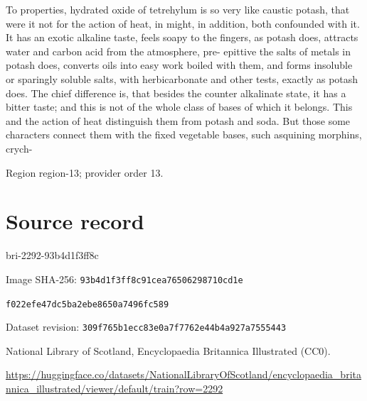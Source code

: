\documentclass[11pt]{article}
\begin{document}
To properties, hydrated oxide of tetrehylum is so very like caustic potash, that were it not for the action of heat, in might, in addition, both confounded with it. It has an exotic alkaline taste, feels soapy to the fingers, as potash does, attracts water and carbon acid from the atmosphere, pre- epittive the salts of metals in potash does, converts oils into easy work boiled with them, and forms insoluble or sparingly soluble salts, with herbicarbonate and other tests, exactly as potash does. The chief difference is, that besides the counter alkalinate state, it has a bitter taste; and this is not of the whole class of bases of which it belongs. This and the action of heat distinguish them from potash and soda. But those some characters connect them with the fixed vegetable bases, such asquining morphins, crych-
\par

{\scriptsize\color{gray} Region region-13; provider order 13.\par}
\medskip
\newpage\section*{Source record}
bri-2292-93b4d1f3ff8c\par
Image SHA-256: \texttt{93b4d1f3ff8c91cea76506298710cd1e}\par\texttt{f022efe47dc5ba2ebe8650a7496fc589}\par
Dataset revision: \texttt{309f765b1ecc83e0a7f7}\texttt{762e44b4a927a7555443}\par
National Library of Scotland, Encyclopaedia Britannica Illustrated (CC0).\par
\url{https://huggingface.co/datasets/NationalLibraryOfScotland/encyclopaedia_britannica_illustrated/viewer/default/train?row=2292}
\end{document}
